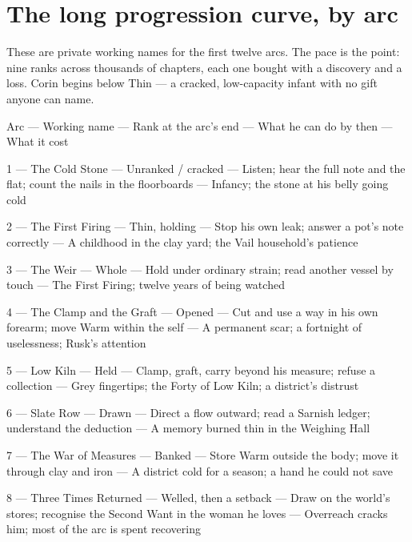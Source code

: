 \documentclass{design/chronicle}
\begin{document}
\section*{The long progression curve, by arc}

These are private working names for the first twelve arcs. The pace is the point: nine ranks across thousands of chapters, each one bought with a discovery and a loss. Corin begins below Thin — a cracked, low-capacity infant with no gift anyone can name.

Arc — Working name — Rank at the arc’s end — What he can do by then — What it cost\par

1 — The Cold Stone — Unranked / cracked — Listen; hear the full note and the flat; count the nails in the floorboards — Infancy; the stone at his belly going cold\par

2 — The First Firing — Thin, holding — Stop his own leak; answer a pot’s note correctly — A childhood in the clay yard; the Vail household’s patience\par

3 — The Weir — Whole — Hold under ordinary strain; read another vessel by touch — The First Firing; twelve years of being watched\par

4 — The Clamp and the Graft — Opened — Cut and use a way in his own forearm; move Warm within the self — A permanent scar; a fortnight of uselessness; Rusk’s attention\par

5 — Low Kiln — Held — Clamp, graft, carry beyond his measure; refuse a collection — Grey fingertips; the Forty of Low Kiln; a district’s distrust\par

6 — Slate Row — Drawn — Direct a flow outward; read a Sarnish ledger; understand the deduction — A memory burned thin in the Weighing Hall\par

7 — The War of Measures — Banked — Store Warm outside the body; move it through clay and iron — A district cold for a season; a hand he could not save\par

8 — Three Times Returned — Welled, then a setback — Draw on the world’s stores; recognise the Second Want in the woman he loves — Overreach cracks him; most of the arc is spent recovering\par
\end{document}
